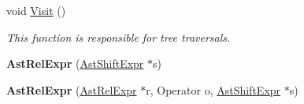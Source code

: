 \begin{DoxyCompactItemize}
\item 
void \hyperlink{classAstRelExpr_ae1a3ad7c0ce7a205222ec0b1de5ee884}{Visit} ()
\begin{DoxyCompactList}\small\item\em This function is responsible for tree traversals. \end{DoxyCompactList}\item 
\hypertarget{classAstRelExpr_a17bddafe8d750f50ae41eb9c87410b1e}{{\bfseries Ast\-Rel\-Expr} (\hyperlink{classAstShiftExpr}{Ast\-Shift\-Expr} $\ast$s)}\label{classAstRelExpr_a17bddafe8d750f50ae41eb9c87410b1e}

\item 
\hypertarget{classAstRelExpr_a7a8c51e92d85456cd8da5b426f6958cf}{{\bfseries Ast\-Rel\-Expr} (\hyperlink{classAstRelExpr}{Ast\-Rel\-Expr} $\ast$r, Operator o, \hyperlink{classAstShiftExpr}{Ast\-Shift\-Expr} $\ast$s)}\label{classAstRelExpr_a7a8c51e92d85456cd8da5b426f6958cf}


\end{DoxyCompactItemize}

